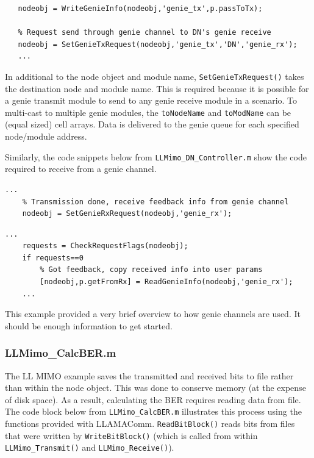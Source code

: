\begin{lstlisting}[name=llmimoANCon,firstnumber=53]
   % Put send data into module's genie queue
   nodeobj = WriteGenieInfo(nodeobj,'genie_tx',p.passToTx);

   % Request send through genie channel to DN's genie receive
   nodeobj = SetGenieTxRequest(nodeobj,'genie_tx','DN','genie_rx');
   ...
\end{lstlisting}

In additional to the node object and module name,
\verb+SetGenieTxRequest()+ takes the destination node and module
name.  This is required because it is possible for a genie transmit
module to send to any genie receive module in a scenario.   To multi-cast to multiple genie modules, the \verb+toNodeName+ and \verb+toModName+ can be (equal sized) cell arrays.  Data is delivered to the genie queue for each specified node/module address.

Similarly, the code snippets below from
\verb+LLMimo_DN_Controller.m+ show the code required to receive from
a genie channel.

\begin{lstlisting}[name=llmimoDNCon,firstnumber=62]
    ...
    % Transmission done, receive feedback info from genie channel
    nodeobj = SetGenieRxRequest(nodeobj,'genie_rx');
\end{lstlisting}

\begin{lstlisting}[name=llmimoDNCon,firstnumber=72]
    ...
    requests = CheckRequestFlags(nodeobj);
    if requests==0
        % Got feedback, copy received info into user params
        [nodeobj,p.getFromRx] = ReadGenieInfo(nodeobj,'genie_rx');
    ...
\end{lstlisting}

This example provided a very brief overview to how genie channels
are used. It should be enough information to get started.

\subsubsection{LLMimo\_CalcBER.m}

The LL MIMO example saves the transmitted and received bits to file
rather than within the node object.  This was done to conserve
memory (at the expense of disk space).  As a result, calculating the
BER requires reading data from file.  The code block below from
\verb+LLMimo_CalcBER.m+ illustrates this process using the functions
provided with LLAMAComm.  \verb+ReadBitBlock()+ reads bits from
files that were written by \verb+WriteBitBlock()+ (which is called
from within \verb+LLMimo_Transmit()+ and \verb+LLMimo_Receive()+).

